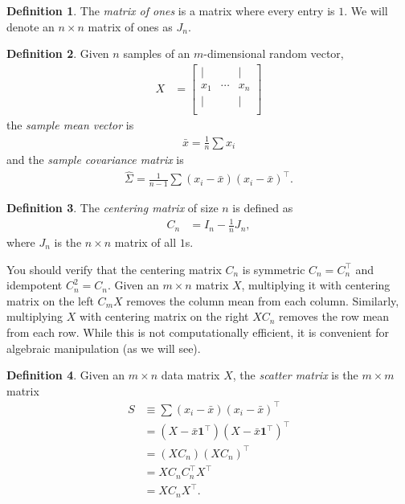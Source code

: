 \documentclass[]{article}
\theoremstyle{plain}
\theoremstyle{definition}
\newtheorem{defn}{Definition}
\theoremstyle{remark}
\begin{document}
\begin{defn}
The \emph{matrix of ones} is a matrix where every entry is $1$.  We will
denote an $n \times n$ matrix of ones as $J_n$.
\end{defn}

\begin{defn}
Given $n$ samples of an $m$-dimensional random vector,
\begin{align*}
X &= \begin{bmatrix} | & & | \\
  x_1 & \cdots & x_n   \\
  | &  & | \\ 
\end{bmatrix}
\end{align*}
the \emph{sample mean vector} is
\begin{align*}
\bar{x} = \frac{1}{n}\sum x_i
\end{align*}
and the \emph{sample covariance matrix} is
\begin{align*}
\hat{\Sigma} = \frac{1}{n-1}\sum (x_i - \bar{x})(x_i - \bar{x})^\top.
\end{align*}
\end{defn}

\begin{defn}
The \emph{centering matrix} of size $n$ is defined as
\begin{align*}
C_n &= I_n - \frac{1}{n}J_n,
\end{align*}
where $J_n$ is the $n \times n$ matrix of all $1$s.
\end{defn}

You should verify that the centering matrix $C_n$ is symmetric $C_n = C_n^\top$
and idempotent $C_n^2 = C_n$.  Given an $m \times n$ matrix $X$, multiplying it
with centering matrix on the left $C_m X$ removes the column mean from each
column. Similarly, multiplying $X$ with centering matrix on the right $XC_n$
removes the row mean from each row. While this is not computationally efficient,
it is convenient for algebraic manipulation (as we will see).

\begin{defn}
Given an $m \times n$ data matrix $X$, the \emph{scatter matrix} is the
$m \times m$ matrix
\begin{align*}
S &\equiv \sum (x_i - \bar{x})(x_i - \bar{x})^\top \\
 &= (X - \bar{x}\mathbf{1}^\top)  (X - \bar{x}\mathbf{1}^\top)^\top \\
 &= (XC_n)(XC_n)^\top \\
 &= XC_nC_n^\top X^\top \\
 &= XC_n X^\top.
\end{align*}
\end{defn}
\end{document}
